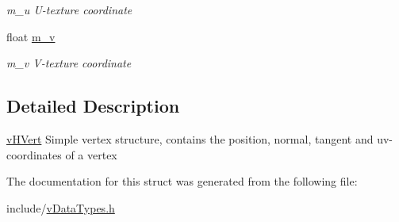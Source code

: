 \begin{DoxyCompactItemize}
\begin{DoxyCompactList}\small\item\em m\-\_\-u U-\/texture coordinate \end{DoxyCompactList}\item 
\hypertarget{structvHVert_ab0e75c7d2e43c3265aa3810b86249adb}{float \hyperlink{structvHVert_ab0e75c7d2e43c3265aa3810b86249adb}{m\-\_\-v}}\label{structvHVert_ab0e75c7d2e43c3265aa3810b86249adb}

\begin{DoxyCompactList}\small\item\em m\-\_\-v V-\/texture coordinate \end{DoxyCompactList}\end{DoxyCompactItemize}


\subsection{Detailed Description}
\hyperlink{structvHVert}{v\-H\-Vert} Simple vertex structure, contains the position, normal, tangent and uv-\/coordinates of a vertex 

The documentation for this struct was generated from the following file\-:\begin{DoxyCompactItemize}
\item 
include/\hyperlink{vDataTypes_8h}{v\-Data\-Types.\-h}\end{DoxyCompactItemize}
